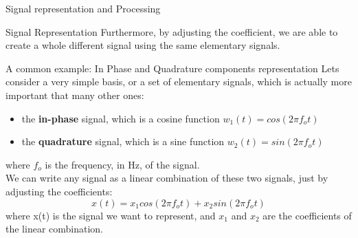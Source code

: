 \begin{section}{Signal representation and Processing}
\begin{subsection}{Signal Representation}
    Furthermore, by adjusting the coefficient, we are able to create a whole different signal using
    the same elementary signals.
    \begin{subsubsection}{A common example: In Phase and Quadrature components representation}
      Lets consider a very simple basis, or a set of elementary signals, which is actually more 
      important that many other ones:
      \begin{itemize}
        \item the \textbf{in-phase} signal, which is a cosine function $w_1(t) = cos(2\pi f_o t)$
        \item the \textbf{quadrature} signal, which is a sine function $w_2(t) = sin(2\pi f_o t)$
      \end{itemize}
      where $f_o$ is the frequency, in Hz, of the signal.\\
      We can write any signal as a linear combination of these two signals, just by adjusting the
      coefficients:
      \begin{equation}
        x(t) = x_1 cos(2\pi f_o t) + x_2 sin(2\pi f_o t)
      \end{equation}
      where x(t) is the signal we want to represent, and $x_1$ and $x_2$ are the coefficients of the
      linear combination.\\


\end{subsubsection}
\end{subsection}
\end{section}
